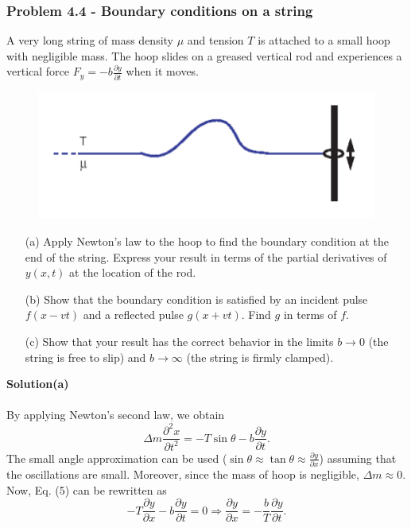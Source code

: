 \documentclass[12pt,a4paper]{article}
\begin{document}
\subsubsection*{Problem 4.4 - Boundary conditions on a string}
A very long string of mass density $\mu$ and tension $T$ is attached to a small hoop with negligible mass. The hoop slides on a greased vertical rod and experiences a vertical force $F_y=-b\frac{\partial y}{\partial t}$ when it moves.
\begin{figure}[h]
    \centering
    \includegraphics[width=0.6\linewidth]{figs/fig_prob_4.4.png}
\end{figure}
\begin{enumerate}
    \item[(a)]Apply Newton’s law to the hoop to find the boundary condition at the end of the string. Express your result in terms of the partial derivatives of $y(x,t)$ at the location of the rod.
    \item[(b)]Show that the boundary condition is satisfied by an incident pulse $f(x-vt)$ and a reflected pulse $g(x+vt)$. Find $g$ in terms of $f$.
    \item[(c)]Show that your result has the correct behavior in the limits $b\rightarrow0$ (the string is free to slip) and $b\rightarrow\infty$ (the string is firmly clamped).
\end{enumerate}
\textbf{Solution(a)}
\\
\\By applying Newton's second law, we obtain
\begin{equation}
    \Delta m\frac{\partial^2x}{\partial t^2}=-T\sin\theta-b\frac{\partial y}{\partial t}.
\end{equation}
The small angle approximation can be used ($\sin\theta\approx\tan\theta\approx\frac{\partial y}{\partial x}$) assuming that the oscillations are small. Moreover, since the mass of hoop is negligible, $\Delta m\approx0$. Now, Eq. (5) can be rewritten as
\begin{equation}
    -T\frac{\partial y}{\partial x}-b\frac{\partial y}{\partial t}=0\Rightarrow\frac{\partial y}{\partial x}=-\frac{b}{T}\frac{\partial y}{\partial t}.
\end{equation}
\end{document}
